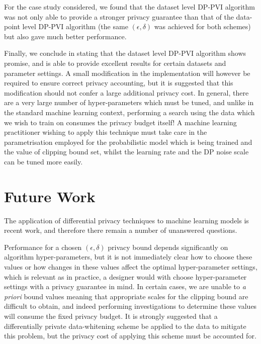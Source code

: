 For the case study considered, we found that the dataset level DP-PVI algorithm was not only able to provide a stronger privacy guarantee than that of the data-point level DP-PVI algorithm (the same $(\epsilon, \delta)$ was achieved for both schemes) but also gave much better performance. 

Finally, we conclude in stating that the dataset level DP-PVI algorithm shows promise, and is able to provide excellent results for certain datasets and parameter settings. A small modification in the implementation will however be required to ensure correct privacy accounting, but it is suggested that this modification should not confer a large additional privacy cost. In general, there are a very large number of hyper-parameters which must be tuned, and unlike in the standard machine learning context, performing a search using the data which we wish to train on consumes the privacy budget itself! A machine learning practitioner wishing to apply this technique must take care in the parametrisation employed for the probabilistic model which is being trained and the value of clipping bound set, whilst the learning rate and the DP noise scale can be tuned more easily. 

\section{Future Work}
The application of differential privacy techniques to machine learning models is recent work, and therefore there remain a number of unanswered questions. 

Performance for a chosen $(\epsilon, \delta)$ privacy bound depends significantly on algorithm hyper-parameters, but it is not immediately clear how to choose these values or how changes in these values affect the optimal hyper-parameter settings, which is relevant as in practice, a designer would with choose hyper-parameter settings with a privacy guarantee in mind. In certain cases, we are unable to \emph{a priori} bound values meaning that appropriate scales for the clipping bound are difficult to obtain, and indeed performing investigations to determine these values will consume the fixed privacy budget. It is strongly suggested that a differentially private data-whitening scheme be applied to the data to mitigate this problem, but the privacy cost of applying this scheme must be accounted for.


